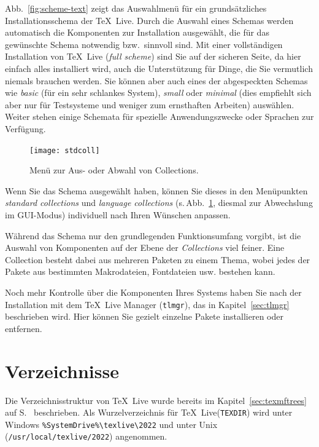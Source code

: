 \documentclass[12pt,ngerman,a4paper,fullparskip]{report}
\newcommand{\TL}{\TeX\ Live\xspace}
\newcommand{\prog}[1]{\texttt{#1}}
\newcommand{\dirname}[1]{\texttt{#1}}
\begin{document}
\noindent Abb.~\ref{fig:scheme-text} zeigt das Auswahlmenü für ein grundsätzliches Installationsschema der
\TL. Durch die Auswahl eines Schemas werden automatisch die Komponenten zur Installation ausgewählt, die
für das gewünschte Schema notwendig bzw.\ sinnvoll sind. Mit einer vollständigen Installation von \TL
(\emph{full scheme}) sind Sie auf der sicheren Seite, da hier einfach alles installiert wird, auch die Unterstützung für Dinge, die Sie vermutlich niemals brauchen werden. Sie können aber auch eines der abgespeckten Schemas wie \emph{basic} (für ein sehr schlankes System), \emph{small}
oder \emph{minimal} (dies empfiehlt sich aber nur für Testsysteme und weniger zum ernsthaften Arbeiten)
auswählen. Weiter stehen einige Schemata für spezielle Anwendungszwecke oder Sprachen zur Verfügung.

\begin{figure}[tb]
\begin{center}
\texttt{[image: stdcoll]}
\caption{Menü zur Aus- oder Abwahl von Collections.}\label{fig:collections-gui}
\end{center}
\end{figure}

Wenn Sie das Schema ausgewählt haben, können Sie dieses in den Menüpunkten \emph{standard collections} und
\emph{language collections} (s.\,Abb.~\ref{fig:collections-gui}, diesmal zur Abwechslung im GUI-Modus)
individuell nach Ihren Wünschen anpassen.

Während das Schema nur den grundlegenden Funktionsumfang vorgibt, ist die Auswahl von Komponenten auf der
Ebene der \emph{Collections} viel feiner. Eine Collection besteht dabei aus mehreren Paketen zu einem Thema,
wobei jedes der Pakete aus bestimmten Makrodateien, Fontdateien usw. bestehen kann.

Noch mehr Kontrolle über die Komponenten Ihres Systems haben Sie nach der Installation mit dem \TeX\ Live Manager (\prog{tlmgr}), das in Kapitel~\ref{sec:tlmgr} beschrieben wird. Hier können Sie gezielt einzelne Pakete installieren oder entfernen.

\section{Verzeichnisse}\label{sec:directories}


Die Verzeichnisstruktur von \TL wurde bereits im Kapitel~\ref{sec:texmftrees} auf S.~\pageref{sec:texmftrees}
beschrieben. Als Wurzelverzeichnis für \TL (\dirname{TEXDIR}) wird unter Windows
\verb|%SystemDrive%\texlive\2022| und unter Unix (\dirname{/usr/local/texlive/2022}) angenommen. 
\end{document}

